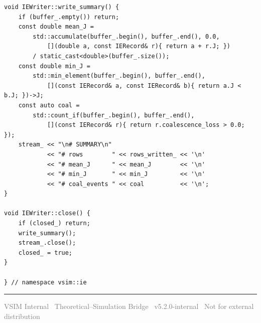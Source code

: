 \documentclass[11pt,a4paper]{article}
\begin{document}
\begin{lstlisting}[style=cppstyle]
void IEWriter::write_summary() {
    if (buffer_.empty()) return;
    const double mean_J =
        std::accumulate(buffer_.begin(), buffer_.end(), 0.0,
            [](double a, const IERecord& r){ return a + r.J; })
        / static_cast<double>(buffer_.size());
    const double min_J =
        std::min_element(buffer_.begin(), buffer_.end(),
            [](const IERecord& a, const IERecord& b){ return a.J < b.J; })->J;
    const auto coal =
        std::count_if(buffer_.begin(), buffer_.end(),
            [](const IERecord& r){ return r.coalescence_loss > 0.0; });
    stream_ << "\n# SUMMARY\n"
            << "# rows        " << rows_written_ << '\n'
            << "# mean_J      " << mean_J        << '\n'
            << "# min_J       " << min_J         << '\n'
            << "# coal_events " << coal          << '\n';
}

void IEWriter::close() {
    if (closed_) return;
    write_summary();
    stream_.close();
    closed_ = true;
}

} // namespace vsim::ie
\end{lstlisting}

\vspace{16pt}\noindent\rule{\linewidth}{0.5pt}
{\small\sffamily\textcolor{gray}{VSIM Internal \textperiodcentered\
Theoretical--Simulation Bridge \textperiodcentered\ v5.2.0-internal
\textperiodcentered\ Not for external distribution}}
\end{document}
